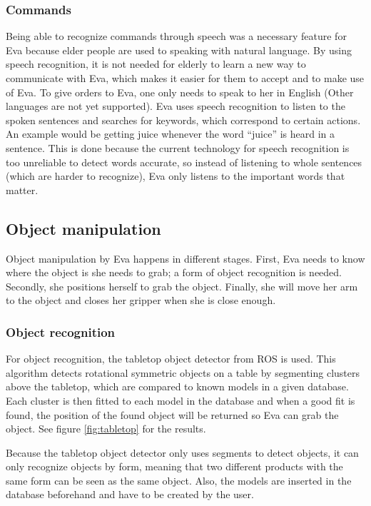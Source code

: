 \documentclass[project_eva.tex]{subfiles}
\begin{document}
\subsubsection*{Commands}
Being able to recognize commands through speech was a necessary feature for Eva because elder people are used to speaking 
with natural language. By using speech recognition, it is not needed for elderly to learn a new way to communicate with 
Eva, which makes it easier for them to accept and to make use of Eva. To give orders to Eva, one only needs to speak to 
her in English (Other languages are not yet supported). Eva uses speech recognition to listen to the spoken sentences and 
searches for keywords, which correspond to certain actions. An example would be getting juice whenever the word ``juice'' 
is heard in a sentence. This is done because the current technology for speech recognition is too unreliable to detect 
words accurate, so instead of listening to whole sentences (which are harder to recognize), Eva only listens to the 
important words that matter.

\subsection*{Object manipulation}
Object manipulation by Eva happens in different stages. First, Eva needs to know where the object is she needs to grab; a 
form of object recognition is needed. Secondly, she  positions herself to grab the object. Finally, she will move her 
arm to the object and closes her gripper when she is close enough.

\subsubsection*{Object recognition}
For object recognition, the tabletop object detector from ROS is used. This algorithm detects rotational symmetric 
objects on a table by segmenting clusters above the tabletop, which are compared to known models in a given database. 
Each cluster is then fitted to each model in the database and when a good fit is found, the position of the found object 
will be returned so Eva can grab the object. See figure \ref{fig:tabletop} for the results.

Because the tabletop object detector only uses segments to detect objects, it can only recognize objects by form, meaning 
that two different products with the same form can be seen as the same object. Also, the models are inserted in the 
database beforehand and have to be created by the user.
\end{document}
